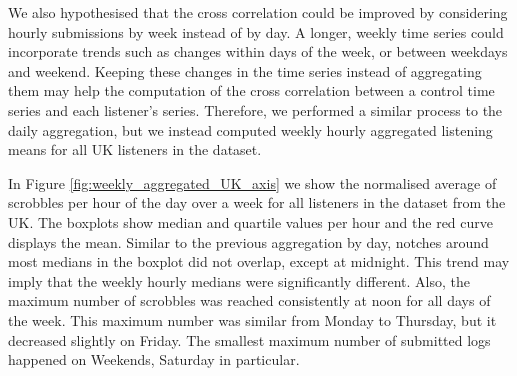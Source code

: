 We also hypothesised that the cross correlation could be improved by considering hourly submissions by week instead of by day. A longer, weekly time series could incorporate trends such as changes within days of the week, or between weekdays and weekend. Keeping these changes in the time series instead of aggregating them may help the computation of the cross correlation between a control time series and each listener's series. Therefore, we performed a similar process to the daily aggregation, but we instead computed weekly hourly aggregated listening means for all UK listeners in the dataset.






In Figure \ref{fig:weekly_aggregated_UK_axis} we show the normalised average of scrobbles per hour of the day over a week for all listeners in the dataset from the UK. The boxplots show median and quartile values per hour and the red curve displays the mean.
Similar to the previous aggregation by day, notches around most medians in the boxplot did not overlap, except at midnight. This trend may imply that the weekly hourly medians were significantly different. Also, the maximum number of scrobbles was reached consistently at noon for all days of the week. This maximum number was similar from Monday to Thursday, but it decreased slightly on Friday. The smallest maximum number of submitted logs happened on Weekends, Saturday in particular. 


